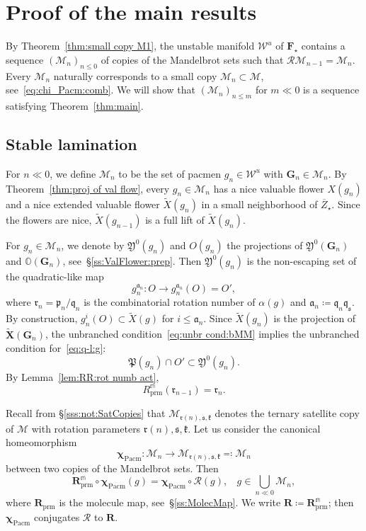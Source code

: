 \documentclass{amsart}
\renewcommand{\sp}{{\ \ }}
\newcommand{\1}{{\mathbb 1 }}
\newcommand{\Mandel}{{\mathcal{M}}}
\newcommand\MM{\mathscr{M}}
\newcommand\bMM{{\pmb {\MM}}}
\newcommand{\bO}{{\mathbb{O}}}
\newcommand\RR{\mathcal{R}}
\newcommand\mRR{\boldsymbol R}%
\newcommand\prm{{\operatorname{prm}}}
\newcommand\cRRc{R_{\prm}}%
\newcommand\mRRc{ \boldsymbol R_{\prm}}%
\newcommand\Post{{\mathfrak P}}
\newcommand\frakY{{\mathfrak Y}}
\newcommand{\bF}{{\mathbf F}}
\newcommand{\bX}{{\mathbf X}}
\newcommand{\bG}{{\mathbf G}}
\newcommand{\str}{{\star}}
\newcommand{\mm}{\mathbb{m}}
\newcommand{\pp}{\mathfrak{p}}
\renewcommand{\aa}{\mathfrak{a}}
\renewcommand{\qq}{\mathfrak{q}}
\newcommand{\rr}{\mathfrak{r}}
\renewcommand{\ss}{\mathfrak{s}}
\newcommand{\kk}{\mathfrak{k}}
\newcommand\strai{{\boldsymbol \chi}}
\newcommand\WW{\mathcal{W}}
\newcommand\Unst{{\boldsymbol{\mathcal{W}}^u}}
\newcommand\Pacm{{\operatorname{Pacm}}}
\theoremstyle{remark}
\numberwithin{equation}{section}
\theoremstyle{definition}
\theoremstyle{nonumberbreak}
\begin{document}
\section{Proof of the main results}
\label{s:proof:main thms}
By Theorem~\ref{thm:small copy M1}, the unstable manifold $\Unst$ of $\bF_\str$ contains a sequence $(\bMM_n)_{n\le 0}$ of copies of the Mandelbrot sets such that $ \RR \bMM_{n-1}=\bMM_n$. Every $\bMM_n$ naturally corresponds to a small copy $\Mandel_n\subset \Mandel$, see~\eqref{eq:chi_Pacm:comb}. We will show that $(\Mandel_n)_{n\le m}$ for $m\ll 0$ is a sequence satisfying Theorem~\ref{thm:main}.




\subsection{Stable lamination} 
\label{ss:StabLamin}
For $n\ll0$, we define $\MM_n$ to be the set of pacmen $g_n\in \WW^u$ with $\bG_n\in \bMM_n$. By Theorem~\ref{thm:proj of val flow}, every $g_n\in \MM_n$ has a nice valuable flower $X(g_n)$ and a nice extended valuable flower $\widetilde X(g_n)$ in a small neighborhood of $\overline Z_\str$. Since the flowers are nice, $\widetilde X(g_{n-1})$ is a full lift of $\widetilde X(g_{n})$. 
 
For $g_n\in \MM_n$, we denote by $\frakY^0(g_n)$ and $O(g_n)$ the projections of $\frakY^0(\bG_n)$ and $\bO(\bG_n)$, see~\S\ref{ss:ValFlower:prep}. Then $\frakY^0(g_n)$ is the non-escaping set of the quadratic-like map
\begin{equation}
\label{eq:q-l:g}
g^{\aa_n}_n\colon O\to g_n^{\aa_n}(O) = O',
\end{equation} 
where $\rr_n= \pp_n/\qq_{n}$ is the combinatorial rotation number of $\alpha(g)$ and $\aa_n\coloneqq \qq_{n}\qq_{\ss}$. By construction, $g_n^i(O)\subset \widetilde X(g)$ for $i\le \aa_n$. Since $\widetilde X(g_n)$ is the projection of $\widetilde \bX(\bG_n)$, the unbranched condition~\eqref{eq:unbr cond:bMM}  implies the unbranched condition for~\eqref{eq:q-l:g}: 
\begin{equation}
\label{eq:unbr cond:MM} 
\Post(g_n)\cap O'\subset \frakY^0(g_n). 
\end{equation}
By Lemma~\ref{lem:RR:rot numb act}, 
\begin{equation}
\label{eq:rr_n:charact}
\cRRc^\mm (\rr_{n-1}) =\rr_n.
\end{equation}

Recall from \S\ref{sss:not:SatCopies} that $\Mandel_{\rr(n),\ss,\kk}$ denotes the ternary satellite copy of $\Mandel$ with rotation parameters $\rr(n),\ss,\kk$. Let us consider the canonical homeomorphism  
\[\strai_\Pacm\colon \MM_n\to \Mandel_{\rr(n),\ss,\kk}\eqqcolon \Mandel_n\] between two copies of the Mandelbrot sets. Then
\begin{equation}
\label{eq:chi_Pacm:comb}
\mRRc^\mm \circ \strai_{\Pacm}(g)=\strai_{\Pacm} \circ \RR(g),\sp\sp g\in \bigcup_{n\ll0 } \MM_n,
\end{equation}
where $\mRRc$ is the molecule map, see~\S\ref{ss:MolecMap}. We write $\mRR\coloneqq \mRRc^\mm$; then $ \strai_{\Pacm}$ conjugates $\RR $ to $\mRR$.
\end{document}
